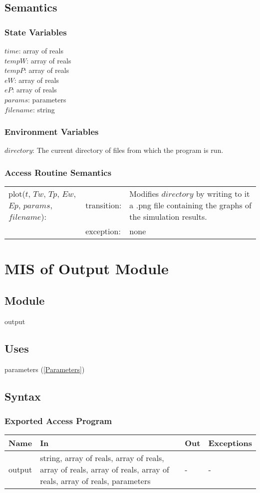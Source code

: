 \documentclass[12pt]{article}
\begin{document}
\subsection{Semantics}
\subsubsection{State Variables}
$time$: array of reals \\
$tempW$: array of reals \\
$tempP$: array of reals \\
$eW$: array of reals \\
$eP$: array of reals \\
$params$: parameters \\
$filename$: string
\subsubsection{Environment Variables}
$directory$: The current directory of files from which the program is run.
\subsubsection{Access Routine Semantics}
\begin{center}
\begin{tabular}{l l p{6cm}}
plot($t$, $Tw$, $Tp$, $Ew$, $Ep$, $params$, $filename$): & transition: & Modifies $directory$ by writing to it a .png file containing the graphs of the simulation results. \\
& exception: & none \\
\end{tabular}
\end{center}

\section{MIS of Output Module} \label{Output}
\subsection{Module}
output
\subsection{Uses}
parameters (\ref{Parameters})
\subsection{Syntax}
\subsubsection{Exported Access Program}
\begin{center}
\begin{tabular}{p{3cm} p{7cm} p{2cm} p{2cm}}
\hline
\textbf{Name} & \textbf{In} & \textbf{Out} & \textbf{Exceptions} \\
\hline
output & string, array of reals, array of reals, array of reals, array of reals, array of reals, array of reals, parameters & - & - \\
\hline
\end{tabular}
\end{center}
\end{document}
